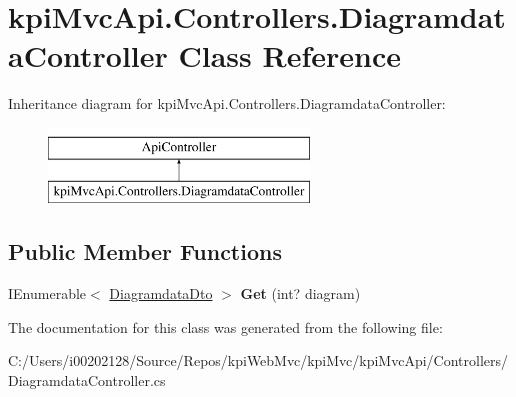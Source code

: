\hypertarget{classkpi_mvc_api_1_1_controllers_1_1_diagramdata_controller}{}\section{kpi\+Mvc\+Api.\+Controllers.\+Diagramdata\+Controller Class Reference}
\label{classkpi_mvc_api_1_1_controllers_1_1_diagramdata_controller}
Inheritance diagram for kpi\+Mvc\+Api.\+Controllers.\+Diagramdata\+Controller\+:\begin{figure}[H]
\begin{center}
\leavevmode
\includegraphics[height=2.000000cm]{classkpi_mvc_api_1_1_controllers_1_1_diagramdata_controller}
\end{center}
\end{figure}
\subsection*{Public Member Functions}
\begin{DoxyCompactItemize}
\item 
\mbox{\label{classkpi_mvc_api_1_1_controllers_1_1_diagramdata_controller_a1e2708509e980e3e6eeb52477826dc87}} 
I\+Enumerable$<$ \hyperlink{classkpi_mvc_api_1_1_data_transfer_objects_1_1_diagramdata_dto}{Diagramdata\+Dto} $>$ {\bfseries Get} (int? diagram)
\end{DoxyCompactItemize}


The documentation for this class was generated from the following file\+:\begin{DoxyCompactItemize}
\item 
C\+:/\+Users/i00202128/\+Source/\+Repos/kpi\+Web\+Mvc/kpi\+Mvc/kpi\+Mvc\+Api/\+Controllers/Diagramdata\+Controller.\+cs\end{DoxyCompactItemize}
